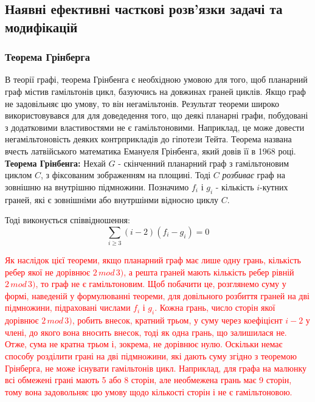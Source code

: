\documentclass[14pt]{article}
\begin{document}
\begin{spacing}{1.175}
        \subsection{\normalfont Наявні ефективні часткові розв'язки задачі та модифікацій}
            \subsubsection{\normalfont Теорема Грінберга}
            \qquad В теорії графі, теорема Грінбенга є необхідною умовою для того, щоб планарний граф містив гамільтонів цикл, базуючись на довжинах граней циклів. Якщо граф не задовільняє цю умову, то він негамільтонів. Результат теореми широко використовувався для для доведедення того, що деякі планарні графи, побудовані з додатковими властивостями не є гамільтоновими. Наприклад, це може довести негамільтоновість деяких контрприкладів до гіпотези Тейта. Теорема названа вчесть латвійського математика Емануеля Грінбенга, який довів її в 1968 році.
            \\

            \textbf{Теорема Грінбенга:} Нехай \(G\) - скінченний планарний граф з гамільтоновим циклом \(C\), з фіксованим зображенням на площині. Тоді \(C\) \textit{розбиває} граф на зовнішню на внутрішню підмножини. Позначимо \(f_i\) і \(g_i\) - кількість \(i\)-кутних граней, які є зовнішніми або внутршінми відносно циклу \(C\). 
            
            Тоді виконується співвідношення: $$ \sum_{i\ge3} (i - 2)(f_i - g_i) = 0 $$

            \textcolor{red}{Як наслідок цієї теореми, якщо планарний граф має лише одну грань, кількість ребер якої не дорівнює \(2\,mod\,3)\), а решта граней мають кількість ребер рівній \(2\,mod\,3)\), то граф не є гамільтоновим. Щоб побачити це, розглянемо суму у формі, наведеній у формулюванні теореми, для довільного розбиття граней на дві підмножини, підраховані числами \(f_i\) і \(g_i\). Кожна грань, число сторін якої дорівнює \(2\,mod\,3)\), робить внесок, кратний трьом, у суму через коефіцієнт \(i-2\) у члені, до якого вона вносить внесок, тоді як одна грань, що залишилася не. Отже, сума не кратна трьом і, зокрема, не дорівнює нулю. Оскільки немає способу розділити грані на дві підмножини, які дають суму згідно з теоремою Грінберга, не може існувати гамільтонів цикл. Наприклад, для графа на малюнку всі обмежені грані мають 5 або 8 сторін, але необмежена грань має 9 сторін, тому вона задовольняє цю умову щодо кількості сторін і не є гамільтоновою.}


\end{spacing}
\end{document}
